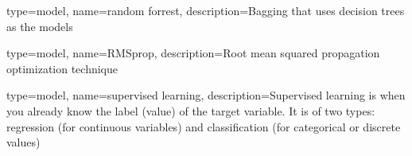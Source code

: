 {
	type=model,
    name=random forrest,
    description={Bagging that uses decision trees as the models}
}

{
	type=model,
    name=RMSprop,
    description={Root mean squared propagation optimization technique}
}

{
	type=model,
    name=supervised learning,
    description={Supervised learning is when you already know the label (value) of the target variable. It is of two types: regression (for continuous variables) and classification (for categorical or discrete values)}
} 